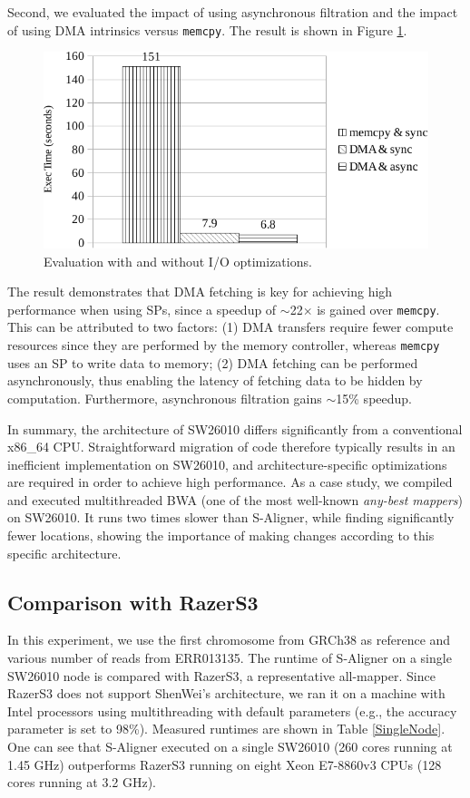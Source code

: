 \documentclass[conference]{IEEEtran}
\begin{document}
Second, we evaluated the impact of using asynchronous filtration and the impact of using DMA intrinsics versus \texttt{memcpy}. The result is shown in Figure \ref{VarOptCha}.

\begin{figure}[!htb]
	\begin{center}
		\includegraphics[width=1\linewidth]{figures/VarOptCha}
		\caption{Evaluation with and without I/O optimizations.}
		\label{VarOptCha}
	\end{center}
\end{figure}

The result demonstrates that DMA fetching is key for achieving high performance when using SPs, since a speedup of $\sim$22$\times$ is gained over \texttt{memcpy}. This can be attributed to two factors: (1) DMA transfers require fewer compute resources since they are performed by the memory controller, whereas \texttt{memcpy} uses an SP to write data to memory; (2) DMA fetching can be performed asynchronously, thus enabling the latency of fetching data to be hidden by computation. Furthermore, asynchronous filtration gains $\sim$15\% speedup.

In summary, the architecture of SW26010 differs significantly from a conventional x86\_64 CPU. Straightforward migration of code therefore typically results in an inefficient implementation on SW26010, and architecture-specific optimizations are required in order to achieve high performance. As a case study, we compiled and executed multithreaded BWA \cite{bwa} (one of the most well-known {\em any-best mappers}) on SW26010. It runs two times slower than S-Aligner, while finding significantly fewer locations, showing the importance of making changes according to this specific architecture.

\subsection{Comparison with RazerS3}
In this experiment, we use the first chromosome from GRCh38 as reference and various number of reads from ERR013135. The runtime of S-Aligner on a single SW26010 node is compared with RazerS3, a representative all-mapper. Since RazerS3 does not support ShenWei's architecture, we ran it on a machine with Intel processors using multithreading with default parameters (e.g., the accuracy parameter is set to 98\%). Measured runtimes are shown in Table \ref{SingleNode}.  One can see that S-Aligner executed on a single SW26010 (260 cores running at 1.45 GHz) outperforms RazerS3 running on eight Xeon E7-8860v3 CPUs (128 cores running at 3.2 GHz).
\end{document}
